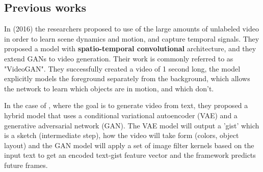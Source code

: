 \subsection{Previous works}

In \cite{vondrick2016generating} (2016) the researchers proposed to use of the large amounts of unlabeled video in order to learn scene dynamics and motion, and capture temporal signals. They proposed a model with \textbf{spatio-temporal convolutional} architecture, and they extend GANs to video generation. Their work is commonly referred to as "VideoGAN". They successfully created a video of 1 second long, the model explicitly models the foreground separately from the background, which allows the network to learn which objects are in motion, and which don't.

In the case of \cite{video_generation_from_text}, where the goal is to generate video from text, they proposed a hybrid model that uses a conditional variational autoencoder (VAE) and a generative adversarial network (GAN). The VAE model will output a 'gist' which is a sketch (intermediate step), how the video will take form (colors, object layout) and the GAN model will apply a set of image filter kernels based on the input text to get an encoded text-gist feature vector and the framework predicts future frames.

